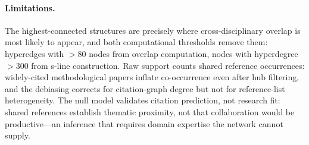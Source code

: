 \paragraph{Limitations.}
The highest-connected structures are precisely where cross-disciplinary overlap is most likely to appear, and both computational thresholds remove them: hyperedges with $> 80$ nodes from overlap computation, nodes with hyperdegree $> 300$ from s-line construction. Raw support counts shared reference occurrences: widely-cited methodological papers inflate co-occurrence even after hub filtering, and the debiasing corrects for citation-graph degree but not for reference-list heterogeneity.
The null model validates citation prediction, not research fit: shared references establish thematic proximity, not that collaboration would be productive---an inference that requires domain expertise the network cannot supply.
